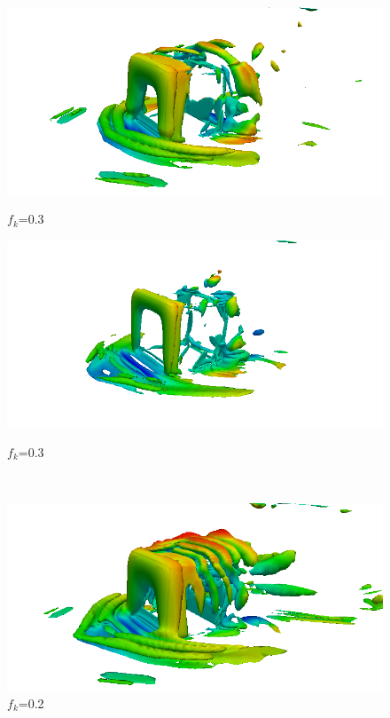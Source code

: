 \begin{figure}[H]
\ContinuedFloat
\begin{minipage}[b]{0.5\linewidth}
\includegraphics[scale=0.25]{figure/coarse/three/iso.png}
\caption*{$f_k$=0.3}
\end{minipage}
\begin{minipage}[b]{0.5\linewidth}
\includegraphics[scale=0.25]{figure/fine/three/iso.png}
\caption*{$f_k$=0.3}
\end{minipage}\\
\begin{minipage}[b]{0.5\linewidth}
\includegraphics[scale=0.25]{figure/coarse/two/iso.png}
\caption*{$f_k$=0.2}

\end{minipage}
\end{figure}

